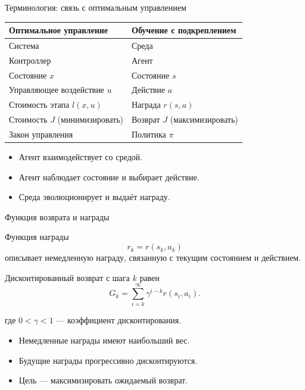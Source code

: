 \documentclass{beamer}
\begin{document}
	
	\begin{frame}{Терминология: связь с оптимальным управлением}
		
		\centering
		\begin{tabular}{ll}
			\textbf{Оптимальное управление} & \textbf{Обучение с подкреплением} \\
			\hline
			Система & Среда \\
			Контроллер & Агент \\
			Состояние $x$ & Состояние $s$ \\
			Управляющее воздействие $u$ & Действие $a$ \\
			Стоимость этапа $l(x,u)$ & Награда $r(s,a)$ \\
			Стоимость $J$ (минимизировать) & Возврат $J$ (максимизировать) \\
			Закон управления & Политика $\pi$
		\end{tabular}
		
		\vspace{0.4cm}
		
		\begin{itemize}
			\item Агент взаимодействует со средой.
			\item Агент наблюдает состояние и выбирает действие.
			\item Среда эволюционирует и выдаёт награду.
		\end{itemize}
		
	\end{frame}
	
	
	\begin{frame}{Функция возврата и награды}
		\begin{flushleft}
			Функция награды
			\[
			r_k = r(s_k,a_k)
			\]
			описывает немедленную награду, связанную с текущим
			состоянием и действием.
			
			\vspace{0.3cm}
			
			Дисконтированный возврат с шага $k$ равен
			\[
			G_k =
			\sum_{i=k}^{\infty}
			\gamma^{i-k}r(s_i,a_i).
			\]
			
			где $0<\gamma<1$ — коэффициент дисконтирования.
			
			\vspace{0.3cm}
			
			\begin{itemize}
				\item Немедленные награды имеют наибольший вес.
				\item Будущие награды прогрессивно дисконтируются.
				\item Цель — максимизировать ожидаемый возврат.
			\end{itemize}
			
		\end{flushleft}
	\end{frame}
	
\end{document}
